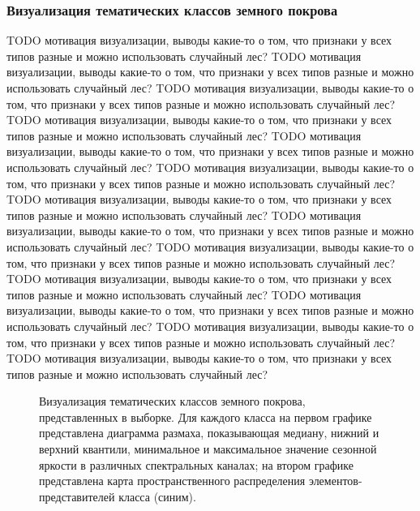\documentclass[14pt, a4paper, oneside]{extarticle}
\begin{document}
\subsubsection{Визуализация тематических классов земного покрова}
TODO мотивация визуализации, выводы какие-то о том, что признаки у всех типов разные и можно использовать случайный лес? TODO мотивация визуализации, выводы какие-то о том, что признаки у всех типов разные и можно использовать случайный лес? TODO мотивация визуализации, выводы какие-то о том, что признаки у всех типов разные и можно использовать случайный лес? TODO мотивация визуализации, выводы какие-то о том, что признаки у всех типов разные и можно использовать случайный лес? TODO мотивация визуализации, выводы какие-то о том, что признаки у всех типов разные и можно использовать случайный лес? TODO мотивация визуализации, выводы какие-то о том, что признаки у всех типов разные и можно использовать случайный лес? TODO мотивация визуализации, выводы какие-то о том, что признаки у всех типов разные и можно использовать случайный лес?
TODO мотивация визуализации, выводы какие-то о том, что признаки у всех типов разные и можно использовать случайный лес? TODO мотивация визуализации, выводы какие-то о том, что признаки у всех типов разные и можно использовать случайный лес? TODO мотивация визуализации, выводы какие-то о том, что признаки у всех типов разные и можно использовать случайный лес? TODO мотивация визуализации, выводы какие-то о том, что признаки у всех типов разные и можно использовать случайный лес?
TODO мотивация визуализации, выводы какие-то о том, что признаки у всех типов разные и можно использовать случайный лес? TODO мотивация визуализации, выводы какие-то о том, что признаки у всех типов разные и можно использовать случайный лес?

\begin{figure}[H]
    \caption{Визуализация тематических классов земного покрова, представленных в выборке. Для каждого класса на первом графике представлена диаграмма размаха, показывающая медиану, нижний и верхний квантили, минимальное и максимальное значение сезонной яркости в различных спектральных каналах; на втором графике представлена карта пространственного распределения элементов-представителей класса (синим).}
\end{figure}
\end{document}

